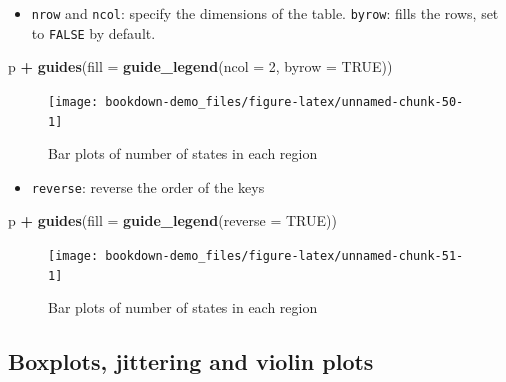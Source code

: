 \documentclass[]{book}
\newenvironment{Shaded}{\begin{snugshade}}{\end{snugshade}}
\newcommand{\KeywordTok}[1]{\textcolor[rgb]{0.13,0.29,0.53}{\textbf{#1}}}
\newcommand{\DataTypeTok}[1]{\textcolor[rgb]{0.13,0.29,0.53}{#1}}
\newcommand{\DecValTok}[1]{\textcolor[rgb]{0.00,0.00,0.81}{#1}}
\newcommand{\StringTok}[1]{\textcolor[rgb]{0.31,0.60,0.02}{#1}}
\newcommand{\OtherTok}[1]{\textcolor[rgb]{0.56,0.35,0.01}{#1}}
\newcommand{\OperatorTok}[1]{\textcolor[rgb]{0.81,0.36,0.00}{\textbf{#1}}}
\newcommand{\NormalTok}[1]{#1}
\providecommand{\tightlist}{%
  \setlength{\itemsep}{0pt}\setlength{\parskip}{0pt}}
\begin{document}
\begin{itemize}
\tightlist
\item
  \texttt{nrow} and \texttt{ncol}: specify the dimensions of the table.
  \texttt{byrow}: fills the rows, set to \texttt{FALSE} by default.
\end{itemize}

\begin{Shaded}
\begin{Highlighting}[]
\NormalTok{p }\OperatorTok{+}\StringTok{ }\KeywordTok{guides}\NormalTok{(}\DataTypeTok{fill =} \KeywordTok{guide_legend}\NormalTok{(}\DataTypeTok{ncol =} \DecValTok{2}\NormalTok{, }\DataTypeTok{byrow =} \OtherTok{TRUE}\NormalTok{))}
\end{Highlighting}
\end{Shaded}

\begin{figure}

{\centering \texttt{[image: bookdown-demo\_files/figure-latex/unnamed-chunk-50-1]} 

}

\caption{Bar plots of number of states in each region}\label{fig:unnamed-chunk-50}
\end{figure}

\begin{itemize}
\tightlist
\item
  \texttt{reverse}: reverse the order of the keys
\end{itemize}

\begin{Shaded}
\begin{Highlighting}[]
\NormalTok{p }\OperatorTok{+}\StringTok{ }\KeywordTok{guides}\NormalTok{(}\DataTypeTok{fill =} \KeywordTok{guide_legend}\NormalTok{(}\DataTypeTok{reverse =} \OtherTok{TRUE}\NormalTok{))}
\end{Highlighting}
\end{Shaded}

\begin{figure}

{\centering \texttt{[image: bookdown-demo\_files/figure-latex/unnamed-chunk-51-1]} 

}

\caption{Bar plots of number of states in each region}\label{fig:unnamed-chunk-51}
\end{figure}

\subsection{Boxplots, jittering and violin
plots}\label{boxplots-jittering-and-violin-plots}
\end{document}
